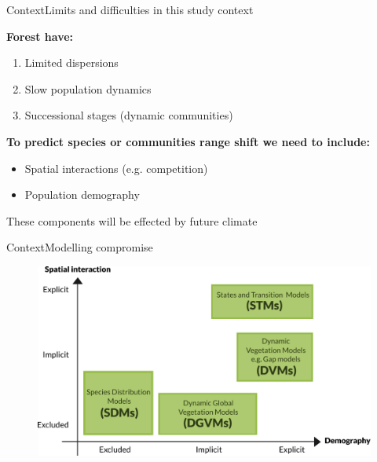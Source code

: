 \documentclass[10pt,aspectratio=149]{beamer}
\begin{document}
\begin{frame}{Context}{Limits and difficulties in this study context}

\textbf{Forest have:}
		\begin{enumerate}
			\item Limited dispersions
			\item Slow population dynamics
			\item Successional stages (dynamic communities)
		\end{enumerate}
\vspace{1em}
\pause
\textbf{To predict species or communities range shift we need to include:}
	\begin{itemize}
		\item Spatial interactions (e.g. competition)
		\item Population demography
	\end{itemize}

	\pause
	\alert{These components will be effected by future climate}
\end{frame}



\begin{frame}{Context}{Modelling compromise}
	
		\begin{figure}
			\includegraphics[width=1.2\paperheight]{Figs/schema_models.pdf}
		\end{figure}
\end{frame}
\end{document}
